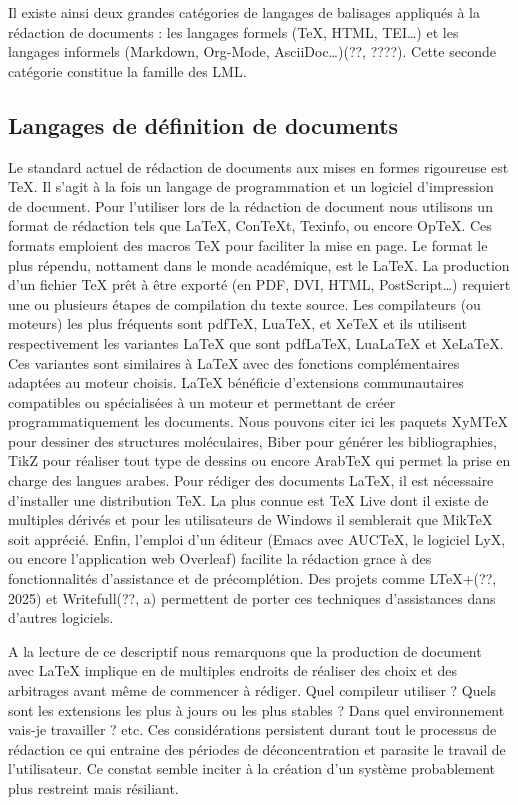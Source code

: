 \documentclass[a4paper,12pt]{article}
\begin{document}
Il existe ainsi deux grandes catégories de langages de balisages appliqués à la rédaction de documents : les langages formels (\TeX{}, HTML, TEI\ldots{}) et les langages informels (Markdown, Org-Mode, AsciiDoc\ldots{})(??, ????). Cette seconde catégorie constitue la famille des LML.
\subsection{Langages de définition de documents}
\label{sec:org3b5143d}
Le standard actuel de rédaction de documents aux mises en formes rigoureuse est \TeX{}. Il s'agit à la fois un langage de programmation et un logiciel d'impression de document. Pour l'utiliser lors de la rédaction de document nous utilisons un format de rédaction tels que \LaTeX{}, ConTeXt, Texinfo, ou encore OpTeX. Ces formats emploient des macros \TeX{} pour faciliter la mise en page. Le format le plus répendu, nottament dans le monde académique, est le \LaTeX{}. La production d'un fichier \TeX{} prêt à être exporté (en PDF, DVI, HTML, PostScript\ldots{}) requiert une ou plusieurs étapes de compilation du texte source. Les compilateurs (ou moteurs) les plus fréquents sont pdfTeX, LuaTeX, et XeTeX et ils utilisent respectivement les variantes \LaTeX{} que sont pdfLaTeX, LuaLaTeX et XeLaTeX. Ces variantes sont similaires à \LaTeX{} avec des fonctions complémentaires adaptées au moteur choisis. \LaTeX{} bénéficie d'extensions communautaires compatibles ou spécialisées à un moteur et permettant de créer programmatiquement les documents. Nous pouvons citer ici les paquets XyMTeX pour dessiner des structures moléculaires, Biber pour générer les bibliographies, TikZ pour réaliser tout type de dessins ou encore ArabTeX qui permet la prise en charge des langues arabes. Pour rédiger des documents \LaTeX{}, il est nécessaire d'installer une distribution \TeX{}. La plus connue est \TeX{} Live dont il existe de multiples dérivés et pour les utilisateurs de Windows il semblerait que MikTeX soit apprécié. Enfin, l'emploi d'un éditeur (Emacs avec AUCTeX, le logiciel LyX, ou encore l'application web Overleaf) facilite la rédaction grace à des fonctionnalités d'assistance et de précomplétion. Des projets comme LTeX+(??, 2025)  et Writefull(??, a) permettent de porter ces techniques d'assistances dans d'autres logiciels.

A la lecture de ce descriptif nous remarquons que la production de document avec \LaTeX{} implique en de multiples endroits de réaliser des choix et des arbitrages avant même de commencer à rédiger. Quel compileur utiliser ? Quels sont les extensions les plus à jours ou les plus stables ? Dans quel environnement vais-je travailler ? etc. Ces considérations persistent durant tout le processus de rédaction ce qui entraine des périodes de déconcentration et parasite le travail de l'utilisateur. Ce constat semble inciter à la création d'un système probablement plus restreint mais résiliant. 
\end{document}
